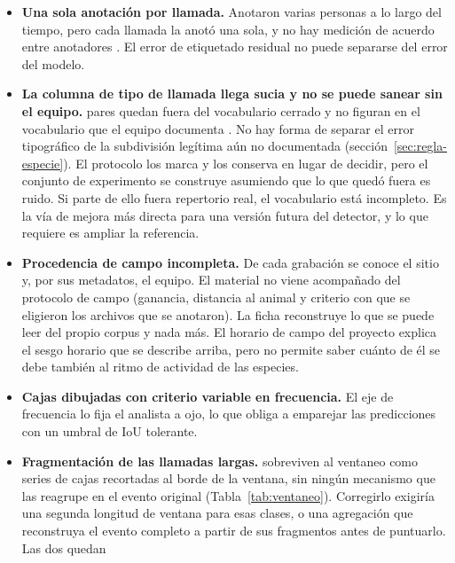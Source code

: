 \begin{itemize}
    \item \textbf{Una sola anotación por llamada.} Anotaron varias personas a lo
          largo del tiempo, pero cada llamada la anotó una sola, y no hay medición
          de acuerdo entre anotadores \citep{nguyen_assessing_2021}. El error de
          etiquetado residual no puede separarse del error del modelo.
    \item \textbf{La columna de tipo de llamada llega sucia y no se puede sanear
          sin el equipo.} \nPairsOutVocab{} pares quedan fuera del vocabulario
          cerrado y no figuran en el vocabulario que el equipo documenta
          \citep{proyecto8_guia_2025}. No hay forma de separar el error
          tipográfico de la subdivisión legítima aún no documentada
          (sección~\ref{sec:regla-especie}). El protocolo los marca y los conserva
          en lugar de decidir, pero el conjunto de experimento se construye
          asumiendo que lo que quedó fuera es ruido. Si parte de ello fuera
          repertorio real, el vocabulario está incompleto. Es la vía de mejora más
          directa para una versión futura del detector, y lo que requiere es
          ampliar la referencia.
    \item \textbf{Procedencia de campo incompleta.} De cada grabación se conoce
          el sitio y, por sus metadatos, el equipo. El material no viene acompañado
          del protocolo de campo (ganancia, distancia al animal y criterio con que
          se eligieron los archivos que se anotaron). La ficha reconstruye lo que
          se puede leer del propio corpus y nada más. El horario de campo del proyecto explica el sesgo
          horario que se describe arriba, pero no permite saber cuánto de él se
          debe también al ritmo de actividad de las especies.
    \item \textbf{Cajas dibujadas con criterio variable en frecuencia.} El eje de
          frecuencia lo fija el analista a ojo, lo que obliga a emparejar las
          predicciones con un umbral de IoU tolerante.
    \item \textbf{Fragmentación de las llamadas largas.} \longClasses{} sobreviven
          al ventaneo como series de cajas recortadas al borde de la ventana, sin
          ningún mecanismo que las reagrupe en el evento original
          (Tabla~\ref{tab:ventaneo}). Corregirlo exigiría una segunda longitud de
          ventana para esas clases, o una agregación que reconstruya el evento
          completo a partir de sus fragmentos antes de puntuarlo. Las dos quedan

\end{itemize}
